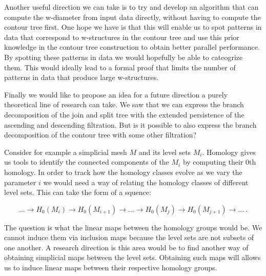 Another useful direction we can take is to try and develop an algorithm that can compute the w-diameter from input data directly, without having to compute the contour tree first. One hope we have is that this will enable us to spot patterns in data that correspond to w-structures in the contour tree and use this prior knowledge in the contour tree construction to obtain better parallel performance. By spotting these patterns in data we would hopefully be able to cateogrize them. This would ideally lead to a formal proof that limits the number of patterns in data that produce large w-structures.

Finally we would like to propose an idea for a future direction a purely theoretical line of research can take. We saw that we can express the branch decomposition of the join and split tree with the extended persistence of the ascending and descending filtration. But is it possible to also express the branch decomposition of the contour tree with some other filtration?

Consider for example a simplicial mesh $M$ and its level sets $M_i$. Homology gives us tools to identify the connected components of the $M_i$ by computing their 0th homology. In order to track how the homology classes evolve as we vary the parameter $i$ we would need a way of relating the homology classes of different level sets. This can take the form of a squence:

$$ ... \rightarrow H_0(M_i) \rightarrow H_0(M_{i+1}) \rightarrow ... \rightarrow H_0(M_{j}) \rightarrow H_0(M_{j+1}) \rightarrow ...~.$$

The question is what the linear maps between the homology groups would be. We cannot induce them via inclusion maps because the level sets are not subsets of one another. A research direction is this area would be to find another way of obtaining simplicial maps between the level sets. Obtaining such maps will allows us to induce  linear maps between their respective homology groups.

%

%
%
%

